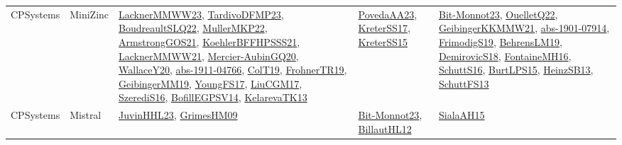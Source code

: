 {\begin{longtable}{lp{3cm}>{\raggedright}p{6cm}>{\raggedright}p{6cm}p{8cm}}
CPSystems & MiniZinc & \href{articles/LacknerMMWW23.pdf}{LacknerMMWW23}\cite{LacknerMMWW23}, \href{papers/TardivoDFMP23.pdf}{TardivoDFMP23}\cite{TardivoDFMP23}, \href{papers/BoudreaultSLQ22.pdf}{BoudreaultSLQ22}\cite{BoudreaultSLQ22}, \href{articles/MullerMKP22.pdf}{MullerMKP22}\cite{MullerMKP22}, \href{papers/ArmstrongGOS21.pdf}{ArmstrongGOS21}\cite{ArmstrongGOS21}, \href{articles/KoehlerBFFHPSSS21.pdf}{KoehlerBFFHPSSS21}\cite{KoehlerBFFHPSSS21}, \href{papers/LacknerMMWW21.pdf}{LacknerMMWW21}\cite{LacknerMMWW21}, \href{papers/Mercier-AubinGQ20.pdf}{Mercier-AubinGQ20}\cite{Mercier-AubinGQ20}, \href{articles/WallaceY20.pdf}{WallaceY20}\cite{WallaceY20}, \href{articles/abs-1911-04766.pdf}{abs-1911-04766}\cite{abs-1911-04766}, \href{papers/ColT19.pdf}{ColT19}\cite{ColT19}, \href{papers/FrohnerTR19.pdf}{FrohnerTR19}\cite{FrohnerTR19}, \href{papers/GeibingerMM19.pdf}{GeibingerMM19}\cite{GeibingerMM19}, \href{papers/YoungFS17.pdf}{YoungFS17}\cite{YoungFS17}, \href{papers/LiuCGM17.pdf}{LiuCGM17}\cite{LiuCGM17}, \href{papers/SzerediS16.pdf}{SzerediS16}\cite{SzerediS16}, \href{papers/BofillEGPSV14.pdf}{BofillEGPSV14}\cite{BofillEGPSV14}, \href{papers/KelarevaTK13.pdf}{KelarevaTK13}\cite{KelarevaTK13} & \href{papers/PovedaAA23.pdf}{PovedaAA23}\cite{PovedaAA23}, \href{articles/KreterSS17.pdf}{KreterSS17}\cite{KreterSS17}, \href{papers/KreterSS15.pdf}{KreterSS15}\cite{KreterSS15} & \href{papers/Bit-Monnot23.pdf}{Bit-Monnot23}\cite{Bit-Monnot23}, \href{papers/OuelletQ22.pdf}{OuelletQ22}\cite{OuelletQ22}, \href{papers/GeibingerKKMMW21.pdf}{GeibingerKKMMW21}\cite{GeibingerKKMMW21}, \href{articles/abs-1901-07914.pdf}{abs-1901-07914}\cite{abs-1901-07914}, \href{papers/FrimodigS19.pdf}{FrimodigS19}\cite{FrimodigS19}, \href{papers/BehrensLM19.pdf}{BehrensLM19}\cite{BehrensLM19}, \href{papers/DemirovicS18.pdf}{DemirovicS18}\cite{DemirovicS18}, \href{papers/FontaineMH16.pdf}{FontaineMH16}\cite{FontaineMH16}, \href{papers/SchuttS16.pdf}{SchuttS16}\cite{SchuttS16}, \href{papers/BurtLPS15.pdf}{BurtLPS15}\cite{BurtLPS15}, \href{articles/HeinzSB13.pdf}{HeinzSB13}\cite{HeinzSB13}, \href{papers/SchuttFS13.pdf}{SchuttFS13}\cite{SchuttFS13}\\
CPSystems & Mistral & \href{papers/JuvinHHL23.pdf}{JuvinHHL23}\cite{JuvinHHL23}, \href{papers/GrimesHM09.pdf}{GrimesHM09}\cite{GrimesHM09} & \href{papers/Bit-Monnot23.pdf}{Bit-Monnot23}\cite{Bit-Monnot23}, \href{papers/BillautHL12.pdf}{BillautHL12}\cite{BillautHL12} & \href{papers/SialaAH15.pdf}{SialaAH15}\cite{SialaAH15}\\

\end{longtable}}
